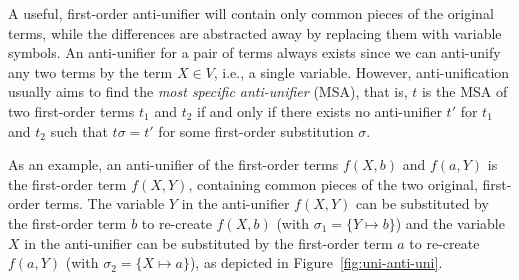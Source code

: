 A useful, first-order anti-unifier will contain only common pieces of the original terms, while the differences are abstracted away by replacing them with variable symbols. An anti-unifier for a pair of terms always exists since we can anti-unify any two terms by the term $X\in V$, i.e., a single variable. However, anti-unification usually aims to find the \emph{most specific anti-unifier} (MSA), that is, $t$ is the MSA of two first-order terms $t_1$ and $t_2$ if and only if there exists no anti-unifier $t'$ for $t_1$ and $t_2$ such that $t\sigma = t'$ for some first-order substitution $\sigma$.

As an example, an anti-unifier of the first-order terms $f(X,b)$ and $f(a,Y)$ is the first-order term $f(X,Y)$, containing common pieces of the two original, first-order terms. The variable $Y$ in the anti-unifier $f(X,Y)$ can be substituted by the first-order term $b$ to re-create $f(X,b)$ (with $\sigma_1 = \{Y\mapsto b\}$) and the variable $X$ in the anti-unifier can be substituted by the first-order term $a$ to re-create $f(a,Y)$
(with $\sigma_2 = \{X\mapsto a\}$), as depicted in Figure~\ref{fig:uni-anti-uni}.


